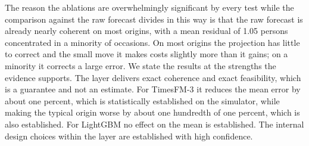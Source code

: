 \documentclass[utf8]{FrontiersinHarvard}
\newif\ifsecondrevisionmarkup
\newcommand{\rev}[1]{\ifsecondrevisionmarkup\textcolor{revisiontwo}{#1}\else#1\fi}
\theoremstyle{plain}
\theoremstyle{definition}
\theoremstyle{remark}
\begin{document}
\rev{The reason the ablations are overwhelmingly significant by every test while the comparison against the raw forecast divides in this way is that the raw forecast is already nearly coherent on most origins, with a mean residual of \num{1.05} persons concentrated in a minority of occasions. On most origins the projection has little to correct and the small move it makes costs slightly more than it gains; on a minority it corrects a large error. We state the results at the strengths the evidence supports. The layer delivers exact coherence and exact feasibility, which is a guarantee and not an estimate. For TimesFM-3 it reduces the mean error by about one percent, which is statistically established on the simulator, while making the typical origin worse by about one hundredth of one percent, which is also established. For LightGBM no effect on the mean is established. The internal design choices within the layer are established with high confidence.}
\end{document}

